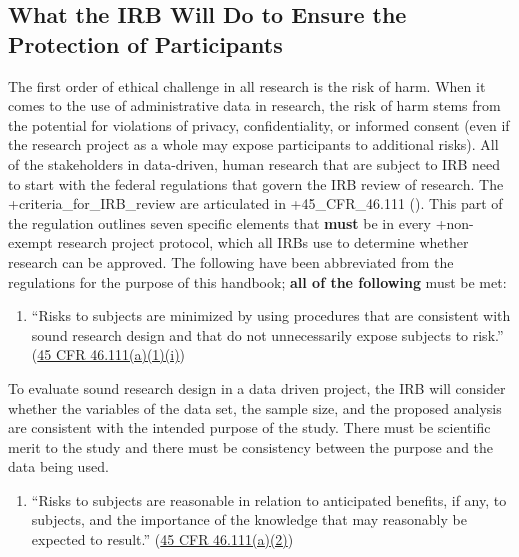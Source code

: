 \documentclass[
]{WileySix}
\providecommand{\tightlist}{%
  \setlength{\itemsep}{0pt}\setlength{\parskip}{0pt}}
\begin{document}
\hypertarget{what-the-irb-will-do-to-ensure-the-protection-of-participants}{%
\subsection{What the IRB Will Do to Ensure the Protection of Participants}\label{what-the-irb-will-do-to-ensure-the-protection-of-participants}}

The first order of ethical challenge in all research is the risk of harm. When it comes to the use of administrative data in research, the risk of harm stems from the potential for violations of privacy, confidentiality, or informed consent (even if the research project as a whole may expose participants to additional risks). All of the stakeholders in data-driven, human research that are subject to IRB need to start with the federal regulations that govern the IRB review of research. The +criteria\_for\_IRB\_review\textbar{} are articulated in +45\_CFR\_46.111\textbar{} (\citet{codeoffederalregulations2017}). This part of the regulation outlines seven specific elements that \textbf{must} be in every +non-exempt\textbar{} research project protocol, which all IRBs use to determine whether research can be approved. The following have been abbreviated from the regulations for the purpose of this handbook; \textbf{all of the following} must be met:

\begin{enumerate}
\def\labelenumi{(\arabic{enumi})}
\tightlist
\item
  ``Risks to subjects are minimized by using procedures that are consistent with sound research design and that do not unnecessarily expose subjects to risk.'' (\href{https://www.law.cornell.edu/cfr/text/45/46.111}{45 CFR 46.111(a)(1)(i)})
\end{enumerate}

To evaluate sound research design in a data driven project, the IRB will consider whether the variables of the data set, the sample size, and the proposed analysis are consistent with the intended purpose of the study. There must be scientific merit to the study and there must be consistency between the purpose and the data being used.

\begin{enumerate}
\def\labelenumi{(\arabic{enumi})}
\setcounter{enumi}{1}
\tightlist
\item
  ``Risks to subjects are reasonable in relation to anticipated benefits, if any, to subjects, and the importance of the knowledge that may reasonably be expected to result.'' (\href{https://www.law.cornell.edu/cfr/text/45/46.111}{45 CFR 46.111(a)(2)})
\end{enumerate}
\end{document}
